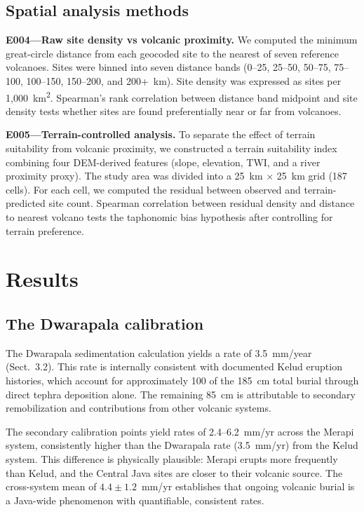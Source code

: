 \documentclass[egqsj, manuscript]{copernicus}
\begin{document}
\subsection{Spatial analysis methods}

\textbf{E004---Raw site density vs volcanic proximity.} We computed the minimum great-circle distance from each geocoded site to the nearest of seven reference volcanoes. Sites were binned into seven distance bands (0--25, 25--50, 50--75, 75--100, 100--150, 150--200, and 200+~km). Site density was expressed as sites per 1,000~km\textsuperscript{2}. Spearman's rank correlation between distance band midpoint and site density tests whether sites are found preferentially near or far from volcanoes.

\textbf{E005---Terrain-controlled analysis.} To separate the effect of terrain suitability from volcanic proximity, we constructed a terrain suitability index combining four DEM-derived features (slope, elevation, TWI, and a river proximity proxy). The study area was divided into a 25~km $\times$ 25~km grid (187 cells). For each cell, we computed the residual between observed and terrain-predicted site count. Spearman correlation between residual density and distance to nearest volcano tests the taphonomic bias hypothesis after controlling for terrain preference.


\section{Results}

\subsection{The Dwarapala calibration}

The Dwarapala sedimentation calculation yields a rate of 3.5~mm/year (Sect.~3.2). This rate is internally consistent with documented Kelud eruption histories, which account for approximately 100 of the 185~cm total burial through direct tephra deposition alone. The remaining 85~cm is attributable to secondary remobilization and contributions from other volcanic systems.

The secondary calibration points yield rates of 2.4--6.2~mm/yr across the Merapi system, consistently higher than the Dwarapala rate (3.5~mm/yr) from the Kelud system. This difference is physically plausible: Merapi erupts more frequently than Kelud, and the Central Java sites are closer to their volcanic source. The cross-system mean of $4.4 \pm 1.2$~mm/yr establishes that ongoing volcanic burial is a Java-wide phenomenon with quantifiable, consistent rates.
\end{document}
